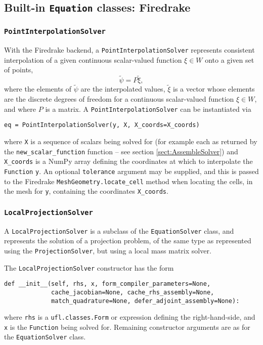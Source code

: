 \documentclass[11pt]{article}
\begin{document}
\subsection{Built-in \texttt{Equation} classes: Firedrake}

\subsubsection{\texttt{PointInterpolationSolver}}

With the Firedrake backend, a \texttt{PointInterpolationSolver} represents
consistent interpolation of a given continuous scalar-valued function
$\xi \in W$ onto a given set of points,
\begin{equation*}
  \tilde{\psi} = P \tilde{\xi},
\end{equation*}
where the elements of $\tilde{\psi}$ are the interpolated values, $\tilde{\xi}$
is a vector whose elements are the discrete degrees of freedom for a continuous
scalar-valued function $\xi \in W$, and where $P$ is a matrix. A
\texttt{PointInterpolationSolver} can be instantiated via
\begin{lstlisting}
eq = PointInterpolationSolver(y, X, X_coords=X_coords)
\end{lstlisting}
where \texttt{X} is a sequence of scalars being solved for (for example each as
returned by the \texttt{new\_scalar\_function} function -- see section
\ref{sect:AssembleSolver}) and \texttt{X\_coords} is a NumPy array defining the
coordinates at which to interpolate the \texttt{Function} \texttt{y}. An
optional \texttt{tolerance} argument may be supplied, and this is passed to the
Firedrake \texttt{MeshGeometry.locate\_cell} method when locating the cells, in
the mesh for \texttt{y}, containing the coordinates \texttt{X\_coords}.

\subsubsection{\texttt{LocalProjectionSolver}}

A \texttt{LocalProjectionSolver} is a subclass of the \texttt{EquationSolver}
class, and represents the solution of a projection problem, of the same type as
represented using the \texttt{ProjectionSolver}, but using a local mass matrix
solver.

The \texttt{LocalProjectionSolver} constructor has the form
\begin{lstlisting}
def __init__(self, rhs, x, form_compiler_parameters=None,
             cache_jacobian=None, cache_rhs_assembly=None,
             match_quadrature=None, defer_adjoint_assembly=None):
\end{lstlisting}
where \texttt{rhs} is a \texttt{ufl.classes.Form} or expression defining
the right-hand-side, and \texttt{x} is the \texttt{Function} being solved for.
Remaining constructor arguments are as for the \texttt{EquationSolver} class.
\end{document}
